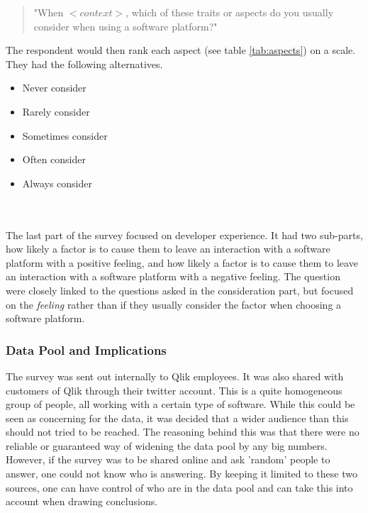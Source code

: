 \documentclass{cslthse-msc}
\begin{document}
    \begin{quote}
        "When $<context>$, which of these traits or aspects do you usually consider when using a software platform?"
    \end{quote}
    The respondent would then rank each aspect (see table \ref{tab:aspects}) on a scale. They had the following alternatives.
    \begin{itemize}[label={-}]
        \item Never consider
        \item Rarely consider
        \item Sometimes consider
        \item Often consider
        \item Always consider
    \end{itemize}
    \\ \\
    The last part of the survey focused on developer experience. It had
    two sub-parts, how likely a factor is to cause them to leave an
    interaction with a software platform with a positive feeling, and how
    likely a factor is to cause them to leave an interaction with a software
    platform with a negative feeling. The question were closely linked to
    the questions asked in the consideration part, but focused on the
    \textit{feeling} rather than if they usually consider the factor when choosing
    a software platform.

    \subsubsection{Data Pool and Implications}
    The survey was sent out internally to Qlik employees. It was also shared with customers of Qlik through their twitter account. This is a quite homogeneous group of people, all working with a certain type of software. While this could be seen as concerning for the data, it was decided that a wider audience than this should not tried to be reached. The reasoning behind this was that there were no reliable or guaranteed way of widening the data pool by any big numbers. However, if the survey was to be shared online and ask 'random' people to answer, one could not know who is answering. By keeping it limited to these two sources, one can have control of who are in the data pool and can take this into account when drawing conclusions.
\end{document}
